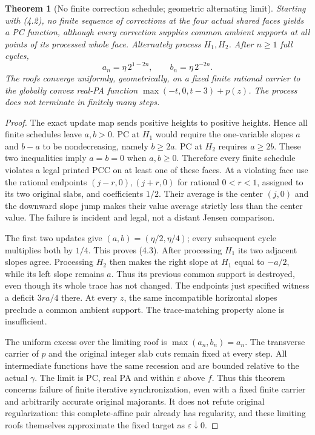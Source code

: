 \documentclass[11pt]{article}
\newtheorem{theorem}{Theorem}[section]
\begin{document}
\begin{theorem}[No finite correction schedule; geometric alternating limit]\label{thm:nonterm}
Starting with (4.2), no finite sequence of corrections at the four actual shared faces yields a PC function, although every correction supplies common ambient supports at all points of its processed whole face. Alternately process $H_1,H_2$. After $n\geq1$ full cycles,
\[
 a_n=\eta\,2^{1-2n},\qquad b_n=\eta\,2^{-2n}.                        \tag{4.3}
\]
The roofs converge uniformly, geometrically, on a fixed finite rational carrier to the globally convex real-PA function $\max(-t,0,t-3)+p(z)$. The process does not terminate in finitely many steps.
\end{theorem}
\begin{proof}
The exact update map sends positive heights to positive heights. Hence all finite schedules leave $a,b>0$. PC at $H_1$ would require the one-variable slopes $a$ and $b-a$ to be nondecreasing, namely $b\geq2a$. PC at $H_2$ requires $a\geq2b$. These two inequalities imply $a=b=0$ when $a,b\geq0$. Therefore every finite schedule violates a legal printed PCC on at least one of these faces. At a violating face use the rational endpoints $(j-r,0),(j+r,0)$ for rational $0<r<1$, assigned to its two original slabs, and coefficients $1/2$. Their average is the center $(j,0)$ and the downward slope jump makes their value average strictly less than the center value. The failure is incident and legal, not a distant Jensen comparison.

The first two updates give $(a,b)=(\eta/2,\eta/4)$; every subsequent cycle multiplies both by $1/4$. This proves (4.3). After processing $H_1$ its two adjacent slopes agree. Processing $H_2$ then makes the right slope at $H_1$ equal to $-a/2$, while its left slope remains $a$. Thus its previous common support is destroyed, even though its whole trace has not changed. The endpoints just specified witness a deficit $3ra/4$ there. At every $z$, the same incompatible horizontal slopes preclude a common ambient support. The trace-matching property alone is insufficient.

The uniform excess over the limiting roof is $\max(a_n,b_n)=a_n$. The transverse carrier of $p$ and the original integer slab cuts remain fixed at every step. All intermediate functions have the same recession and are bounded relative to the actual $\gamma$. The limit is PC, real PA and within $\varepsilon$ above $f$. Thus this theorem concerns failure of finite iterative synchronization, even with a fixed finite carrier and arbitrarily accurate original majorants. It does not refute original regularization: this complete-affine pair already has regularity, and these limiting roofs themselves approximate the fixed target as $\varepsilon\downarrow0$.
\end{proof}
\end{document}
